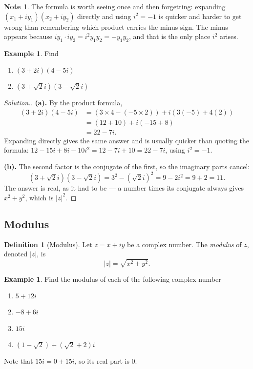 \documentclass[11pt,a4paper]{article}
\theoremstyle{definition}
\newtheorem{definition}[thm]{Definition}
\newtheorem{example}[thm]{Example}
\newtheorem{note}[thm]{Note}
\newenvironment{solution}
  {\renewcommand{\qedsymbol}{}\begin{proof}[\textit{Solution}.]}
  {\end{proof}}
\begin{document}
\begin{note}
The formula is worth seeing once and then forgetting: expanding
$\left(x_1+iy_1\right)\left(x_2+iy_2\right)$ directly and using $i^{2}=-1$ is
quicker and harder to get wrong than remembering which product carries the minus
sign. The minus appears because $iy_1\cdot iy_2=i^{2}y_1y_2=-y_1y_2$, and that
is the only place $i^{2}$ arises.
\end{note}
\begin{example}

Find
\begin{enumerate}
\item[(a).] $(3+2i)(4-5i)$
\item[(b).] $(3+\sqrt{2}i)(3-\sqrt{2}i)$
\end{enumerate}
\end{example}
\begin{solution}
\textbf{(a).} By the product formula,
\begin{align*}
(3+2i)(4-5i) &= (3\times 4-(-5\times 2))+i(3(-5)+4(2))\\
             &= (12+10)+i(-15+8)\\
             &= 22-7i .
\end{align*}
Expanding directly gives the same answer and is usually quicker than quoting the
formula: $12-15i+8i-10i^{2}=12-7i+10=22-7i$, using $i^{2}=-1$.

\textbf{(b).} The second factor is the conjugate of the first, so the imaginary
parts cancel:
$$\left(3+\sqrt{2}i\right)\left(3-\sqrt{2}i\right)=3^{2}-\left(\sqrt{2}i\right)^{2}
=9-2i^{2}=9+2=11 .$$
The answer is real, as it had to be --- a number times its conjugate always gives
$x^{2}+y^{2}$, which is $\left|z\right|^{2}$.
\end{solution}
\subsection{Modulus}

\begin{definition}[Modulus]
Let $z=x+iy$ be a complex number. The \emph{modulus} of $z$, denoted $|z|$, is
$$|z|=\sqrt{x^{2}+y^{2}} .$$
\end{definition}
\begin{example}

Find the modulus of each of the following complex number
\begin{enumerate}
\item[(a).] $5+12i$
\item[(b).] $-8+6i$
\item[(c).] $15i$
\item[(d).] $(1-\sqrt{2})+(\sqrt{2}+2)i$
\end{enumerate}
Note that $15i=0+15i$, so its real part is $0$.
\end{example}
\end{document}
